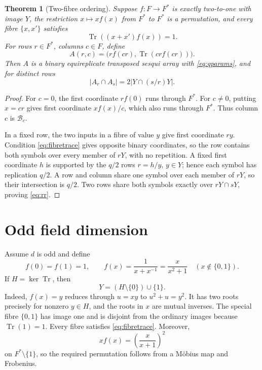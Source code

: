 \documentclass[11pt]{article}
\newtheorem{theorem}{Theorem}[section]
\theoremstyle{definition}\newtheorem{definition}[theorem]{Definition}
\theoremstyle{remark}\newtheorem{remark}[theorem]{Remark}
\DeclareMathOperator{\Tr}{Tr}
\begin{document}
\begin{theorem}[Two-fibre ordering]
\label{thm:twofibre}
Suppose \(f:F\to F^*\) is exactly two-to-one with image \(Y\), the restriction
\(x\mapsto xf(x)\) from \(F^*\) to \(F^*\) is a permutation, and every fibre
\(\{x,x'\}\) satisfies
\begin{equation}
 \Tr((x+x')f(x))=1.
 \label{eq:fibretrace}
\end{equation}
For rows \(r\in F^*\), columns \(c\in F\), define
\begin{equation}
 A(r,c)=\bigl(rf(cr),\Tr(crf(cr))\bigr).
 \label{eq:cells}
\end{equation}
Then \(A\) is a binary equireplicate transposed sesqui array with
\eqref{eq:qparams}, and for distinct rows
\begin{equation}
 |A_r\cap A_s|=2|Y\cap(s/r)Y|.
 \label{eq:rr}
\end{equation}
\end{theorem}
\begin{proof}
For \(c=0\), the first coordinate \(rf(0)\) runs through \(F^*\).  For
\(c\neq0\), putting \(x=cr\) gives first coordinate \(xf(x)/c\), which also
runs through \(F^*\).  Thus column \(c\) is \(\mathcal B_c\).

In a fixed row, the two inputs in a fibre of value \(y\) give first coordinate
\(ry\).  Condition \eqref{eq:fibretrace} gives opposite binary coordinates,
so the row contains both symbols over every member of \(rY\), with no
repetition.  A fixed first coordinate \(h\) is supported by the \(q/2\) rows
\(r=h/y\), \(y\in Y\); hence each symbol has replication \(q/2\).  A row
and column share one symbol over each member of \(rY\), so their intersection
is \(q/2\).  Two rows share both symbols exactly over \(rY\cap sY\), proving
\eqref{eq:rr}.
\end{proof}

\section{Odd field dimension}
Assume \(d\) is odd and define
\begin{equation}
 f(0)=f(1)=1,\qquad
 f(x)=\frac1{x+x^{-1}}=\frac{x}{x^2+1}
 \quad(x\notin\{0,1\}).
 \label{eq:inverse}
\end{equation}
If \(H=\ker\Tr\), then
\begin{equation}
 Y=(H\setminus\{0\})\cup\{1\}.
 \label{eq:Yodd}
\end{equation}
Indeed, \(f(x)=y\) reduces through \(u=xy\) to
\(u^2+u=y^2\).  It has two roots precisely for nonzero \(y\in H\), and the
roots in \(x\) are mutual inverses.  The special fibre \(\{0,1\}\) has image
one and is disjoint from the ordinary images because \(\Tr(1)=1\).  Every
fibre satisfies \eqref{eq:fibretrace}.  Moreover,
\[
 xf(x)=\left(\frac{x}{x+1}\right)^2
\]
on \(F^*\setminus\{1\}\), so the required permutation follows from a Möbius
map and Frobenius.
\end{document}
